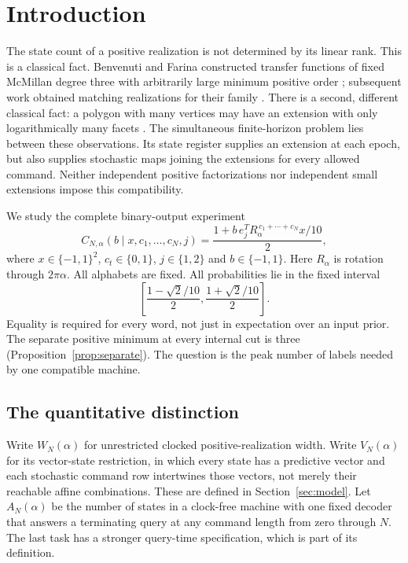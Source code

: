 \section{Introduction}
The state count of a positive realization is not determined by its linear
rank. This is a classical fact. Benvenuti and Farina constructed transfer
functions of fixed McMillan degree three with arbitrarily large minimum
positive order \cite{BF99}; subsequent work obtained matching realizations
for their family \cite[Example 2]{CJM}. There is a second, different
classical fact: a polygon with many vertices may have an extension with
only logarithmically many facets \cite{Yannakakis,FRT,VGG}.
The simultaneous finite-horizon problem lies between these observations.
Its state register supplies an extension at each epoch, but also supplies
stochastic maps joining the extensions for every allowed command.
Neither independent positive factorizations nor independent small
extensions impose this compatibility.

We study the complete binary-output experiment
\begin{equation}\label{eq:array}
 C_{N,\alpha}(b\mid x,c_1,\ldots,c_N,j)
 =\frac{1+b\,e_j^T R_\alpha^{\,c_1+\cdots+c_N}x/10}{2},
\end{equation}
where $x\in\{-1,1\}^2$, $c_t\in\{0,1\}$, $j\in\{1,2\}$ and
$b\in\{-1,1\}$. Here $R_\alpha$ is rotation through $2\pi\alpha$.
All alphabets are fixed. All probabilities lie in the fixed interval
\[
 \left[\frac{1-\sqrt2/10}{2},\frac{1+\sqrt2/10}{2}\right].
\]
Equality is required for every word, not just in expectation over an
input prior. The separate positive minimum at every internal cut is three
(Proposition~\ref{prop:separate}). The question is the peak number of
labels needed by one compatible machine.

\subsection{The quantitative distinction}
Write $W_N(\alpha)$ for unrestricted clocked positive-realization width.
Write $V_N(\alpha)$ for its vector-state restriction, in which every state
has a predictive vector and each stochastic command row intertwines those
vectors, not merely their reachable affine combinations. These are defined
in Section~\ref{sec:model}. Let $A_N(\alpha)$ be the number of states in a
clock-free machine with one fixed decoder that answers a terminating query
at any command length from zero through $N$. The last task has a stronger
query-time specification, which is part of its definition.

